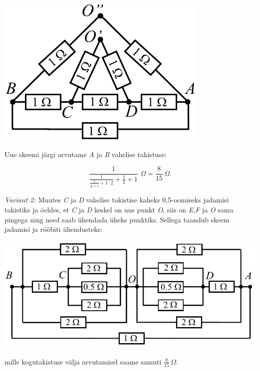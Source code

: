 \begin{center}
\includegraphics[scale=0.8]{2020-v3g-05-yl4.pdf}\\
\end{center}
Uue skeemi järgi arvutame \emph{A} ja \emph{B} vahelise takistuse:

$$ \frac{1}{\frac{1}{\displaystyle{\frac{1}{\frac{1}{2}+1} + 1 \cdot 2}}+\frac{1}{2}  + 1} \,\, \SI{}\Omega =\frac{8}{15} \, \SI{}\Omega.$$

\emph{Variant 2:} Muutes \emph{C} ja \emph{D} vahelise takistise kaheks 0,5-oomiseks jadamisi takistiks ja öeldes, et \emph{C} ja \emph{D} keskel on uus punkt \emph{O}, siis on \emph{E},\emph{F} ja \emph{O} sama pingega ning need saab ühendada üheks punktiks. Sellega taandub skeem jadamisi ja rööbiti ühendusteks:
\begin{center}
\includegraphics[scale=0.9]{2020-v3g-05-yl5.pdf}\\
\end{center}
mille kogutakistuse välja arvutamisel saame samuti $\frac{8}{15} \, \SI{}\Omega$.
\probend